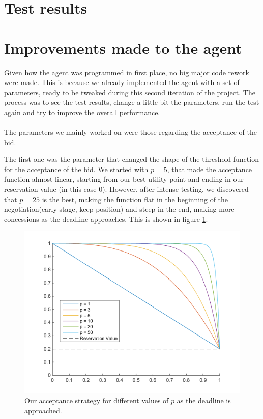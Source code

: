 \documentclass[a4,11pt]{scrartcl}
\begin{document}
\section{Test results}
\label{sec:testresults}



\section{Improvements made to the agent}
Given how the agent was programmed in first place, no big major code rework were made. This is because we already implemented the agent with a set of parameters, ready to be tweaked during this second iteration of the project. The process was to see the test results, change a little bit the parameters, run the test again and try to improve the overall performance.
\\ \\
The parameters we mainly worked on were those regarding the acceptance of the bid.

The first one was the parameter that changed the shape of the threshold function for the acceptance of the bid. We started with $p=5$, that made the acceptance function almost linear, starting from our best utility point and ending in our reservation value (in this case 0). However, after intense testing, we discovered that $p=25$ is the best, making the function flat in the beginning of the negotiation(early stage, keep position) and steep in the end, making more concessions as the deadline approaches. This is shown in figure \ref{fig:chicken}.
\label{sec:improvements}
\begin{figure}[ht]
    \centering
    \includegraphics[width=\textwidth]{chicken.png}
    \caption{Our acceptance strategy for different values of $p$ as the deadline is approached.}
    \label{fig:chicken}
\end{figure}
\end{document}
